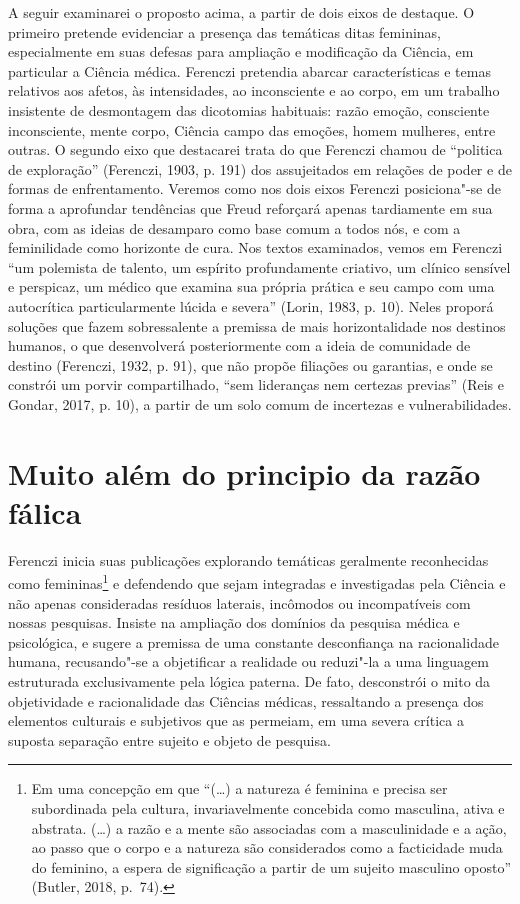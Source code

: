 A seguir examinarei o proposto acima, a partir de dois eixos de
destaque. O primeiro pretende evidenciar a presença das temáticas ditas
femininas, especialmente em suas defesas para ampliação e modificação da
Ciência, em particular a Ciência médica. Ferenczi pretendia abarcar
características e temas relativos aos afetos, às intensidades, ao
inconsciente e ao corpo, em um trabalho insistente de desmontagem das
dicotomias habituais: razão  emoção, consciente  inconsciente, mente  corpo, Ciência  campo das emoções, homem  mulheres, entre outras. O
segundo eixo que destacarei trata do que Ferenczi chamou de ``politica
de exploração'' (Ferenczi, 1903, p. 191) dos assujeitados em relações de
poder e de formas de enfrentamento. Veremos como nos dois eixos Ferenczi
posiciona"-se de forma a aprofundar tendências que Freud reforçará apenas
tardiamente em sua obra, com as ideias de desamparo como base comum a
todos nós, e com a feminilidade como horizonte de cura. Nos textos
examinados, vemos em Ferenczi ``um polemista de talento, um espírito
profundamente criativo, um clínico sensível e perspicaz, um médico que
examina sua própria prática e seu campo com uma autocrítica
particularmente lúcida e severa'' (Lorin, 1983, p. 10). Neles proporá
soluções que fazem sobressalente a premissa de mais horizontalidade nos
destinos humanos, o que desenvolverá posteriormente com a ideia de
comunidade de destino (Ferenczi, 1932, p. 91), que não propõe filiações
ou garantias, e onde se constrói um porvir compartilhado, ``sem
lideranças nem certezas previas'' (Reis e Gondar, 2017, p. 10), a partir
de um solo comum de incertezas e vulnerabilidades.

\section{Muito além do principio da razão fálica }

Ferenczi inicia suas publicações explorando temáticas geralmente
reconhecidas como femininas\footnote{Em uma concepção em que ``(\ldots{}) a
  natureza é feminina e precisa ser subordinada pela cultura,
  invariavelmente concebida como masculina, ativa e abstrata. (\ldots{}) a
  razão e a mente são associadas com a masculinidade e a ação, ao passo
  que o corpo e a natureza são considerados como a facticidade muda do
  feminino, a espera de significação a partir de um sujeito masculino
  oposto'' (Butler, 2018, p.~74).} e defendendo que sejam integradas e
investigadas pela Ciência e não apenas consideradas resíduos laterais,
incômodos ou incompatíveis com nossas pesquisas. Insiste na ampliação
dos domínios da pesquisa médica e psicológica, e sugere a premissa de
uma constante desconfiança na racionalidade humana, recusando"-se a
objetificar a realidade ou reduzi"-la a uma linguagem estruturada
exclusivamente pela lógica paterna. De fato, desconstrói o mito da
objetividade e racionalidade das Ciências médicas, ressaltando a
presença dos elementos culturais e subjetivos que as permeiam, em uma
severa crítica a suposta separação entre sujeito e objeto de pesquisa.

